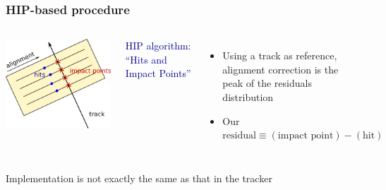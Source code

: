 \documentclass[compress]{beamer}
\begin{document}
\begin{frame}
\frametitle{HIP-based procedure}

\begin{columns}
\includegraphics[width=\linewidth]{hip_explanation.png}


\textcolor{darkblue}{HIP algorithm: ``Hits and Impact Points''}
\begin{itemize}
\item Using a track as reference, alignment correction is the peak of the residuals distribution

\item Our $\mbox{residual} \equiv \left(\mbox{impact point}\right) - \left(\mbox{hit}\right)$

\end{itemize}
\end{columns}

\vspace{0.2 cm}
Implementation is not exactly the same as that in the tracker


\end{frame}
\end{document}
